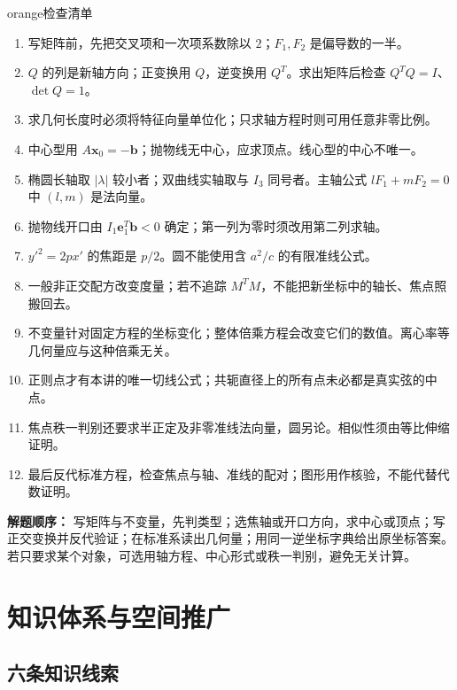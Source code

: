 \documentclass[11pt,a4paper]{article}
\providecommand{\tightlist}{\setlength{\itemsep}{3pt}\setlength{\parskip}{0pt}}
\begin{document}
\begin{sboxenv}{orange}{检查清单}
\begin{enumerate}
\def\labelenumi{\arabic{enumi}.}
\tightlist
\item
  写矩阵前，先把交叉项和一次项系数除以 \(2\)；\(F_1,F_2\)
  是偏导数的一半。
\item
  \(Q\) 的列是新轴方向；正变换用 \(Q\)，逆变换用 \(Q^T\)。求出矩阵后检查
  \(Q^TQ=I\)、\(\det Q=1\)。
\item
  求几何长度时必须将特征向量单位化；只求轴方程时则可用任意非零比例。
\item
  中心型用
  \(A\boldsymbol x_0=-\boldsymbol b\)；抛物线无中心，应求顶点。线心型的中心不唯一。
\item
  椭圆长轴取 \(|\lambda|\) 较小者；双曲线实轴取与 \(I_3\)
  同号者。主轴公式 \(lF_1+mF_2=0\) 中 \((l,m)\) 是法向量。
\item
  抛物线开口由 \(I_1\boldsymbol e_1^T\boldsymbol b<0\)
  确定；第一列为零时须改用第二列求轴。
\item
  \(y'^2=2px'\) 的焦距是 \(p/2\)。圆不能使用含 \(a^2/c\)
  的有限准线公式。
\item
  一般非正交配方改变度量；若不追踪
  \(M^TM\)，不能把新坐标中的轴长、焦点照搬回去。
\item
  不变量针对固定方程的坐标变化；整体倍乘方程会改变它们的数值。离心率等几何量应与这种倍乘无关。
\item
  正则点才有本讲的唯一切线公式；共轭直径上的所有点未必都是真实弦的中点。
\item
  焦点秩一判别还要求半正定及非零准线法向量，圆另论。相似性须由等比伸缩证明。
\item
  最后反代标准方程，检查焦点与轴、准线的配对；图形用作核验，不能代替代数证明。
\end{enumerate}

\end{sboxenv}

\textbf{解题顺序：}
写矩阵与不变量，先判类型；选焦轴或开口方向，求中心或顶点；写正交变换并反代验证；在标准系读出几何量；用同一逆坐标字典给出原坐标答案。若只要求某个对象，可选用轴方程、中心形式或秩一判别，避免无关计算。

\section{知识体系与空间推广}\label{ux77e5ux8bc6ux4f53ux7cfbux4e0eux7a7aux95f4ux63a8ux5e7f}

\subsection{六条知识线索}\label{ux516dux6761ux77e5ux8bc6ux7ebfux7d22}
\end{document}

